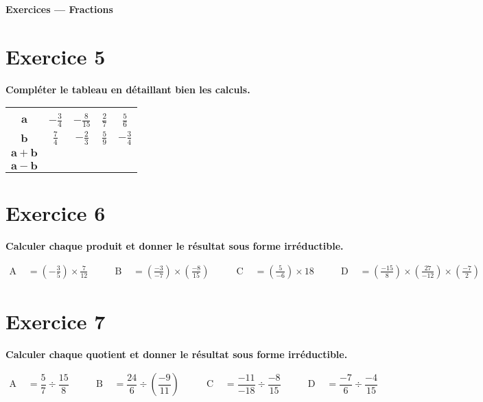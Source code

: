 \documentclass[a4paper,11pt]{article}
\begin{document}
\bigskip
{\Large \textbf{Exercices — Fractions}}\par\medskip

\section*{Exercice 5}
\textbf{Compléter le tableau en détaillant bien les calculs.}

\medskip
\renewcommand{\arraystretch}{1.4}
\begin{tabular}{|c|c|c|c|c|}
\hline
 &  &  &  &  \\
\(\mathbf{a}\) & \(\displaystyle -\frac{3}{4}\) & \(\displaystyle -\frac{8}{15}\) & \(\displaystyle \frac{2}{7}\) & \(\displaystyle \frac{5}{6}\)\\
\hline
\(\mathbf{b}\) & \(\displaystyle \frac{7}{4}\) & \(\displaystyle -\frac{2}{3}\) & \(\displaystyle \frac{5}{9}\) & \(\displaystyle -\frac{3}{4}\)\\
\hline
\(\mathbf{a+b}\) &  &  &  &  \\
\hline
\(\mathbf{a-b}\) &  &  &  &  \\
\hline
\end{tabular}

\section*{Exercice 6}
\textbf{Calculer chaque produit et donner le résultat sous forme irréductible.}

\[
\begin{aligned}
\text{A }&= \left(-\frac{3}{5}\right)\times\frac{7}{12}
&\qquad
\text{B }&= \left(\frac{-3}{-7}\right)\times\left(\frac{-8}{15}\right)
&\qquad
\text{C }&= \left(\frac{5}{-6}\right)\times 18
&\qquad
\text{D }&= \left(\frac{-15}{8}\right)\times\left(\frac{27}{-12}\right)\times\left(\frac{-7}{2}\right)
\end{aligned}
\]

\section*{Exercice 7}
\textbf{Calculer chaque quotient et donner le résultat sous forme irréductible.}

\[
\begin{aligned}
\text{A }&= \dfrac{5}{7}\div\dfrac{15}{8}
&\qquad
\text{B }&= \dfrac{24}{6}\div\left(\dfrac{-9}{11}\right)
&\qquad
\text{C }&= \dfrac{-11}{-18}\div\dfrac{-8}{15}
&\qquad
\text{D }&= \dfrac{-7}{6}\div\dfrac{-4}{15}
\end{aligned}
\]
\end{document}
